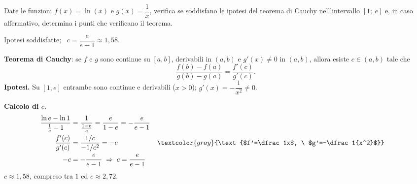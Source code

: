 \begin{question}[ID=1.4, subtitle={Teorema di Cauchy per $\ln x$ e $1/x$ su $[1,e]$}, tags={cauchy, teoremi}, difficulty=media]
Date le funzioni \(f(x) = \ln(x)\) e \(g(x) = \dfrac{1}{x}\), verifica se soddisfano le ipotesi del teorema di Cauchy nell'intervallo \([1;\ e]\) e, in caso affermativo, determina i punti che verificano il teorema.
\begin{solution}
Ipotesi soddisfatte; \ $c=\dfrac{e}{e-1}\approx1{,}58$.
\end{solution}
\begin{explanation}
\textbf{Teorema di Cauchy}: se $f$ e $g$ sono continue su $[a,b]$, derivabili in $(a,b)$ e $g'(x)\neq0$ in $(a,b)$, allora esiste $c\in(a,b)$ tale che
\[ \dfrac{f(b)-f(a)}{g(b)-g(a)}=\dfrac{f'(c)}{g'(c)}. \]
\textbf{Ipotesi.} Su $[1,e]$ entrambe sono continue e derivabili ($x>0$); $g'(x)=-\dfrac{1}{x^2}\neq0$.

\textbf{Calcolo di $c$.}
\[\begin{aligned}
\dfrac{\ln e-\ln1}{\frac1e-1} &= \dfrac{1}{\frac{1-e}{e}}=\dfrac{e}{1-e}=-\dfrac{e}{e-1}\\
\dfrac{f'(c)}{g'(c)} &= \dfrac{1/c}{-1/c^2}=-c && \textcolor{gray}{\text{$f'=\dfrac1x$, \ $g'=-\dfrac1{x^2}$}}\\
-c &= -\dfrac{e}{e-1} \;\Rightarrow\; c=\dfrac{e}{e-1}
\end{aligned}\]
$c\approx1{,}58$, compreso tra $1$ ed $e\approx2{,}72$.
\end{explanation}
\end{question}


